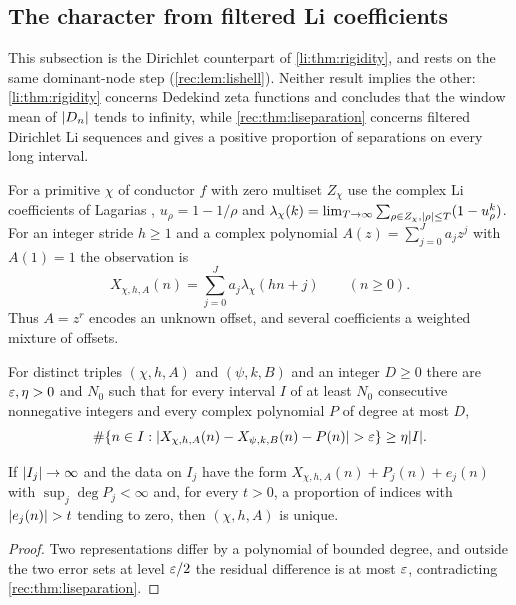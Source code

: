 \subsection{The character from filtered Li coefficients}\label{rec:sec:li}

This subsection is the Dirichlet counterpart of \cref{li:thm:rigidity}, and rests on the same
dominant-node step (\cref{rec:lem:lishell}). Neither result implies the other:
\cref{li:thm:rigidity} concerns Dedekind zeta functions and concludes that the window mean of
$\lvert D_n\rvert$ tends to infinity, while \cref{rec:thm:liseparation} concerns filtered Dirichlet Li
sequences and gives a positive proportion of separations on every long interval.

For a primitive $\chi$ of conductor $f$ with zero multiset $Z_\chi$ use the complex Li coefficients
of Lagarias \cite{Lagarias2007Li}, $u_\rho=1-1/\rho$ and
$\lambda_\chi(k)=\lim_{T\to\infty}\sum_{\rho\in Z_\chi,\lvert\rho\rvert\le T}(1-u_\rho^k)$. For an integer
stride $h\ge1$ and a complex polynomial $A(z)=\sum_{j=0}^Ja_jz^j$ with $A(1)=1$ the observation is
\[
 X_{\chi,h,A}(n)=\sum_{j=0}^Ja_j\lambda_\chi(hn+j)\qquad(n\ge0).
\]
Thus $A=z^r$ encodes an unknown offset, and several coefficients a weighted mixture of offsets.

\begin{theorem}\label{rec:thm:liseparation}
For distinct triples $(\chi,h,A)$ and $(\psi,k,B)$ and an integer $D\ge0$ there are
$\varepsilon,\eta>0$ and $N_0$ such that for every interval $I$ of at least $N_0$ consecutive nonnegative
integers and every complex polynomial $P$ of degree at most $D$,
\[
 \#\{n\in I:\lvert X_{\chi,h,A}(n)-X_{\psi,k,B}(n)-P(n)\rvert>\varepsilon\}\ge\eta\lvert I\rvert .
\]
\end{theorem}

\begin{corollary}\label{rec:cor:liincomplete}
If $\lvert I_j\rvert\to\infty$ and the data on $I_j$ have the form $X_{\chi,h,A}(n)+P_j(n)+e_j(n)$ with
$\sup_j\deg P_j<\infty$ and, for every $t>0$, a proportion of indices with $\lvert e_j(n)\rvert>t$ tending
to zero, then $(\chi,h,A)$ is unique.
\end{corollary}

\begin{proof}
Two representations differ by a polynomial of bounded degree, and outside the two error sets at
level $\varepsilon/2$ the residual difference is at most $\varepsilon$, contradicting
\cref{rec:thm:liseparation}.
\end{proof}

